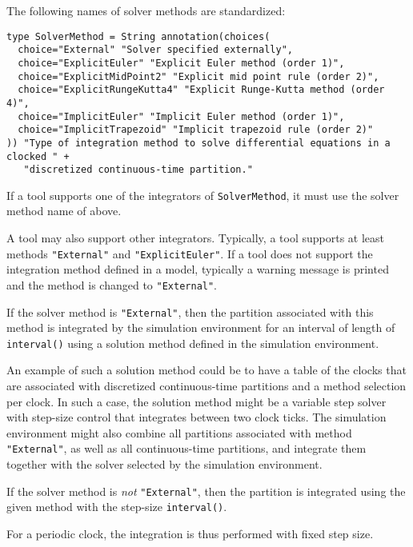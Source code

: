 The following names of solver methods are standardized:
\begin{lstlisting}[language=modelica]
type SolverMethod = String annotation(choices(
  choice="External" "Solver specified externally",
  choice="ExplicitEuler" "Explicit Euler method (order 1)",
  choice="ExplicitMidPoint2" "Explicit mid point rule (order 2)",
  choice="ExplicitRungeKutta4" "Explicit Runge-Kutta method (order 4)",
  choice="ImplicitEuler" "Implicit Euler method (order 1)",
  choice="ImplicitTrapezoid" "Implicit trapezoid rule (order 2)"
)) "Type of integration method to solve differential equations in a clocked " +
   "discretized continuous-time partition."
\end{lstlisting}

If a tool supports one of the integrators of \lstinline!SolverMethod!, it must use the solver method name of above.

\begin{nonnormative}
A tool may also support other integrators.
Typically, a tool supports at least methods \lstinline!"External"! and \lstinline!"ExplicitEuler"!.
If a tool does not support the integration method defined in a model, typically a warning message is printed and the method is changed to \lstinline!"External"!.
\end{nonnormative}

If the solver method is \lstinline!"External"!, then the partition associated with this method is integrated by the simulation environment for an interval of length of
\lstinline!interval()! using a solution method defined in the simulation environment.

\begin{nonnormative}
An example of such a solution method could be to have a table of the clocks that are associated with discretized continuous-time partitions and a method selection per clock.  In such
a case, the solution method might be a variable step solver with step-size control that integrates between two clock ticks. The simulation environment might also combine all partitions associated with method \lstinline!"External"!, as well as all continuous-time partitions, and integrate them together with the solver selected by the simulation environment.
\end{nonnormative}

If the solver method is \emph{not} \lstinline!"External"!, then the partition is
integrated using the given method with the step-size \lstinline!interval()!.

\begin{nonnormative}
For a periodic clock, the integration is thus performed with fixed step size.
\end{nonnormative}

